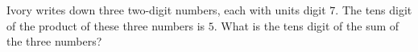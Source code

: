 Ivory writes down three two-digit numbers, each with units digit $7$. The tens digit of the product of these three numbers is $5$. What is the tens digit of the sum of the three numbers?

